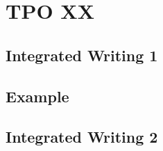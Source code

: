 \section{TPO XX}

\subsection{Integrated Writing 1}

\subsection{Example}

\subsection{Integrated Writing 2}